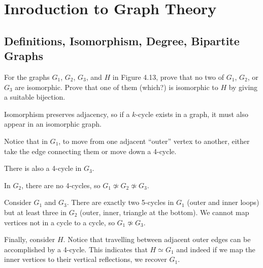 \section{Inroduction to Graph Theory}

\setcounter{subsection}{3}
\subsection{Definitions, Isomorphism, Degree, Bipartite Graphs}

\begin{xca}
  For the graphs $G_1$, $G_2$, $G_3$, and $H$ in Figure 4.13,
  prove that no two of $G_1$, $G_2$, or $G_3$ are isomorphic.
  Prove that one of them (which?) is isomorphic to $H$ by giving a suitable bijection.
\end{xca}
\begin{sol}
  Isomorphism preserves adjacency, so if a $k$-cycle exists in a graph,
  it must also appear in an isomorphic graph.

  Notice that in $G_1$, to move from one adjacent ``outer'' vertex to another,
  either take the edge connecting them or move down a 4-cycle.

  There is also a 4-cycle in $G_3$.

  In $G_2$, there are no 4-cycles, so $G_1 \not\simeq G_2 \not\simeq G_3$.

  Consider $G_1$ and $G_3$.
  There are exactly two 5-cycles in $G_1$ (outer and inner loops)
  but at least three in $G_2$ (outer, inner, triangle at the bottom).
  We cannot map vertices not in a cycle to a cycle, so $G_1 \not\simeq G_3$.

  Finally, consider $H$.
  Notice that travelling between adjacent outer edges can be accomplished by a 4-cycle.
  This indicates that $H \simeq G_1$ and indeed if we map the inner vertices
  to their vertical reflections, we recover $G_1$.
\end{sol}

